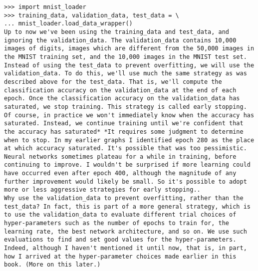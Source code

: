 \begin{lstlisting}
>>> import mnist_loader 
>>> training_data, validation_data, test_data = \
... mnist_loader.load_data_wrapper()
Up to now we've been using the training_data and test_data, and ignoring the validation_data. The validation_data contains 10,000 images of digits, images which are different from the 50,000 images in the MNIST training set, and the 10,000 images in the MNIST test set. Instead of using the test_data to prevent overfitting, we will use the validation_data. To do this, we'll use much the same strategy as was described above for the test_data. That is, we'll compute the classification accuracy on the validation_data at the end of each epoch. Once the classification accuracy on the validation_data has saturated, we stop training. This strategy is called early stopping. Of course, in practice we won't immediately know when the accuracy has saturated. Instead, we continue training until we're confident that the accuracy has saturated* *It requires some judgment to determine when to stop. In my earlier graphs I identified epoch 280 as the place at which accuracy saturated. It's possible that was too pessimistic. Neural networks sometimes plateau for a while in training, before continuing to improve. I wouldn't be surprised if more learning could have occurred even after epoch 400, although the magnitude of any further improvement would likely be small. So it's possible to adopt more or less aggressive strategies for early stopping..
Why use the validation_data to prevent overfitting, rather than the test_data? In fact, this is part of a more general strategy, which is to use the validation_data to evaluate different trial choices of hyper-parameters such as the number of epochs to train for, the learning rate, the best network architecture, and so on. We use such evaluations to find and set good values for the hyper-parameters. Indeed, although I haven't mentioned it until now, that is, in part, how I arrived at the hyper-parameter choices made earlier in this book. (More on this later.)

\end{lstlisting}
